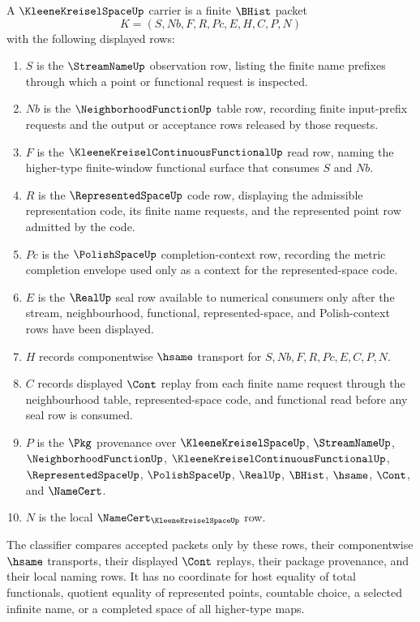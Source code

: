 \begin{definition}
\label{def:kleene-kreisel-space-carrier-classifier}
A $\KleeneKreiselSpaceUp$ carrier is a finite $\BHist$ packet
$$
K=(S,Nb,F,R,Pc,E,H,C,P,N)
$$
with the following displayed rows:
\begin{enumerate}
\item $S$ is the $\StreamNameUp$ observation row, listing the finite name prefixes through which a point or functional request is inspected.
\item $Nb$ is the $\NeighborhoodFunctionUp$ table row, recording finite input-prefix requests and the output or acceptance rows released by those requests.
\item $F$ is the $\KleeneKreiselContinuousFunctionalUp$ read row, naming the higher-type finite-window functional surface that consumes $S$ and $Nb$.
\item $R$ is the $\RepresentedSpaceUp$ code row, displaying the admissible representation code, its finite name requests, and the represented point row admitted by the code.
\item $Pc$ is the $\PolishSpaceUp$ completion-context row, recording the metric completion envelope used only as a context for the represented-space code.
\item $E$ is the $\RealUp$ seal row available to numerical consumers only after the stream, neighbourhood, functional, represented-space, and Polish-context rows have been displayed.
\item $H$ records componentwise $\hsame$ transport for $S,Nb,F,R,Pc,E,C,P,N$.
\item $C$ records displayed $\Cont$ replay from each finite name request through the neighbourhood table, represented-space code, and functional read before any seal row is consumed.
\item $P$ is the $\Pkg$ provenance over $\KleeneKreiselSpaceUp$, $\StreamNameUp$, $\NeighborhoodFunctionUp$, $\KleeneKreiselContinuousFunctionalUp$, $\RepresentedSpaceUp$, $\PolishSpaceUp$, $\RealUp$, $\BHist$, $\hsame$, $\Cont$, and $\NameCert$.
\item $N$ is the local $\NameCert_{\KleeneKreiselSpaceUp}$ row.
\end{enumerate}
The classifier compares accepted packets only by these rows, their componentwise $\hsame$ transports, their displayed $\Cont$ replays, their package provenance, and their local naming rows. It has no coordinate for host equality of total functionals, quotient equality of represented points, countable choice, a selected infinite name, or a completed space of all higher-type maps.
\end{definition}

